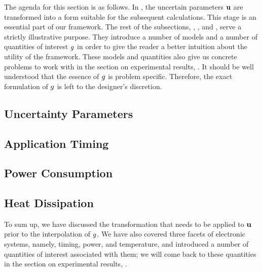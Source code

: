 The agenda for this section is as follows. In , the uncertain
parameters $\mathbf{u}$ are transformed into a form suitable for the subsequent
calculations. This stage is an essential part of our framework. The rest of the
subsections, , , and , serve a strictly
illustrative purpose. They introduce a number of models and a number of
quantities of interest $g$ in order to give the reader a better intuition about
the utility of the framework. These models and quantities also give us concrete
problems to work with in the section on experimental results,
. It should be well understood that the essence of $g$ is
problem specific. Therefore, the exact formulation of $g$ is left to the
designer's discretion.

\subsection{Uncertainty Parameters} 



\subsection{Application Timing} 


\subsection{Power Consumption} 


\subsection{Heat Dissipation} 


To sum up, we have discussed the transformation that needs to be applied to
$\mathbf{u}$ prior to the interpolation of $g$. We have also covered three facets of
electronic systems, namely, timing, power, and temperature, and introduced a
number of quantities of interest associated with them; we will come back to
these quantities in the section on experimental results, .


